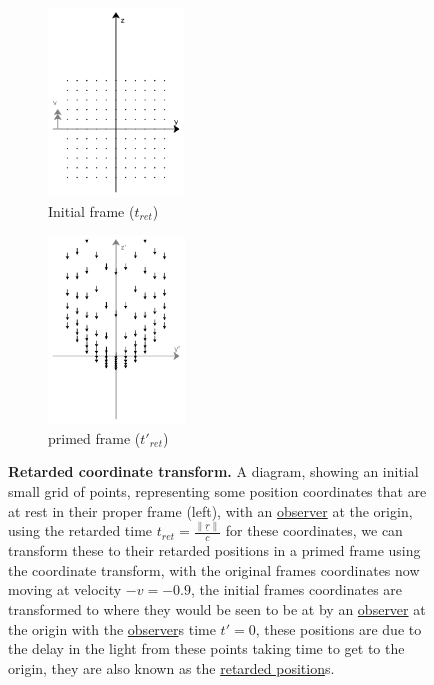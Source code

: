 \begin{figure}[H]
	\centering
	\begin{subfigure}{0.45\textwidth}
		\centering
		\includegraphics[height=5cm]{images/pdf/coord_transform_initial_with_retarded_time.pdf}
		\caption{Initial frame (${t_{ret}}$)}
		\label{fig: retarded coordinate transform subfig_1}
	\end{subfigure}
	\begin{subfigure}{0.45\textwidth}
		\centering
		\includegraphics[height=5cm]{images/pdf/coord_transform_primed_retarded.pdf}
		\caption{primed frame (${t'_{ret}}$)}
		\label{fig: retarded coordinate transform subfig_2}
	\end{subfigure}
	\caption{\textbf{Retarded coordinate transform.} A diagram, showing an initial small grid of points, representing some position coordinates that are at rest in their proper frame (left), with an \protect\hyperlink{def-observer}{observer} at the origin, using the retarded time ${t_{ret}} = \frac{\|\underline{r}\|}{c}$ for these coordinates, we can transform these to their retarded positions in a primed frame using the coordinate transform, with the original frames coordinates now moving at velocity $-{v} =-0.9$, the initial frames coordinates are transformed to where they would be seen to be at by an \protect\hyperlink{def-observer}{observer} at the origin with the \protect\hyperlink{def-observer}{observer}s time ${t{'}} = 0$, these positions are due to the delay in the light from these points taking time to get to the origin, they are also known as the \protect\hyperlink{def-retarded-position}{retarded position}s.}
	\label{fig: retarded coordinate transform}
\end{figure}

